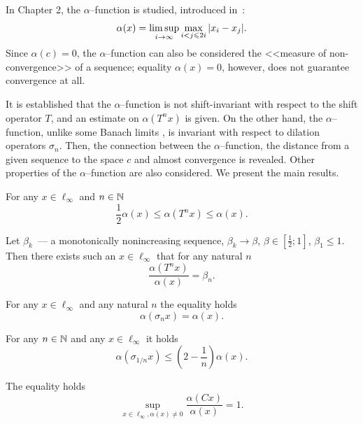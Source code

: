 In Chapter 2,
the $\alpha$--function is studied, introduced in~\cite{our-vzms-2018}:
\begin{equation}
	\alpha(x) = \varlimsup_{i\to\infty} \max_{i<j\leqslant 2i} |x_i - x_j|
	.
\end{equation}
Since $\alpha(c)=0$,
the $\alpha$--function can also be considered the <<measure of non-convergence>> of a sequence;
equality $\alpha(x) = 0$, however, does not guarantee convergence at all.

It is established that the $\alpha$--function is not shift-invariant with respect to the shift operator $T$,
and an estimate on $\alpha(T^n x)$ is given.
On the other hand, the $\alpha$--function, unlike some Banach limits
\cite{Semenov2010invariant,semenov2011structure},
is invariant with respect to dilation operators $\sigma_n$.
Then, the connection between the $\alpha$--function, the distance from a given sequence to the space $c$
and almost convergence is revealed.
Other properties of the $\alpha$--function are also considered.
We present the main results.

	For any $x\in\ell_\infty$ and $n \in \N$
	\begin{equation}\label{est_alpha_Tn_x}
		\frac{1}{2}\alpha(x) \leq \alpha(T^n x) \leq \alpha(x)
		.
	\end{equation}

	Let $\beta_k$~--- a monotonically nonincreasing sequence,
	$\beta_k \to \beta$, $\beta\in\left[\frac{1}{2}; 1\right]$, $\beta_1 \leq 1$.
	Then there exists such an $x\in\ell_\infty$ that for any natural $n$
	\begin{equation}
		\frac{\alpha(T^n x)}{\alpha(x)} = \beta_n.
	\end{equation}

	For any $x\in\ell_\infty$ and any natural $n$ the equality holds
	\begin{equation}
		\alpha(\sigma_n x) = \alpha(x)
		.
	\end{equation}

	For any $n\in\N$ and any $x\in\ell_\infty$ it holds
	\begin{equation}
		\alpha(\sigma_{1/n} x) \leq \left( 2- \frac{1}{n} \right) \alpha(x)
		.
	\end{equation}

	The equality holds
	\begin{equation}
		\sup_{x\in\ell_\infty, \alpha(x)\neq 0} \frac{\alpha(Cx)}{\alpha(x)}=1
		.
	\end{equation}


